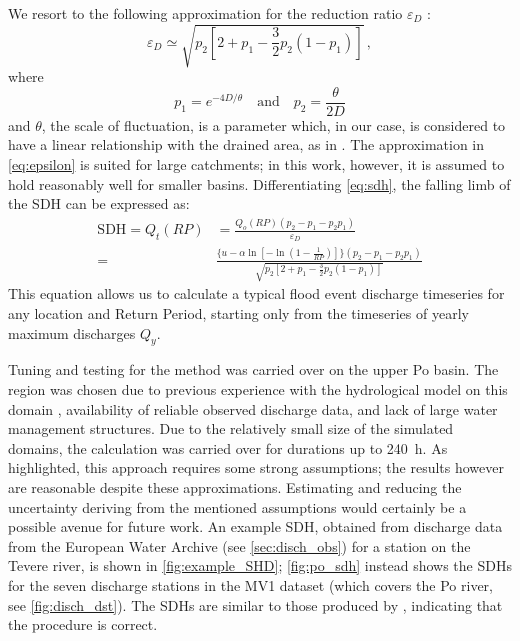 We resort to the following approximation for the reduction ratio $\varepsilon_D$ :
\begin{equation}\label{eq:epsilon}
  \varepsilon_D \simeq \sqrt{p_2 \left[ 2 + p_1 - \frac{3}{2}p_2 \left(1 - p_1 \right) \right]} \,,
\end{equation}
where
\begin{equation}
  p_1 = e^{-4D/\theta} \quad \textrm{and} \quad p_2 = \frac{\theta}{2D}
\end{equation}
and $\theta$, the scale of fluctuation, is a parameter which, in our case, is considered to have a linear relationship with the drained area, as in \citet{Maione2003}. The approximation in \cref{eq:epsilon} is suited for large catchments; in this work, however, it is assumed to hold reasonably well for smaller basins.
Differentiating \cref{eq:sdh}, the falling limb of the SDH can be expressed as:
\begin{equation}
\begin{split}
  \text{SDH} = Q_t\left(RP\right) & = \frac{Q_o\left(RP\right) \left(p_2 - p_1 - p_2p_1\right)}{\varepsilon_D} \\ =
  & \frac{\lbrace u - \alpha \ln \left[ -\ln \left(1 - \frac{1}{RP} \right)\right]\rbrace \left(p_2 - p_1 - p_2p_1\right)}{\sqrt{p_2 \left[ 2 + p_1 - \frac{3}{2}p_2 \left(1 - p_1 \right) \right]}}
\end{split}
\end{equation}
This equation allows us to calculate a typical flood event discharge timeseries for any location and Return Period, starting only from the timeseries of yearly maximum discharges $Q_y$.

Tuning and testing for the method was carried over on the upper Po basin. The region was chosen due to previous experience with the hydrological model on this domain \citep{coppola2014ChahydconPobasundglowar}, availability of reliable observed discharge data, and lack of large water management structures.
Due to the relatively small size of the simulated domains, the calculation was carried over for durations up to \SI{240}{\hour}.
As highlighted, this approach requires some strong assumptions; the results however are reasonable despite these approximations.
Estimating and reducing the uncertainty deriving from the mentioned assumptions would certainly be a possible avenue for future work.
An example SDH, obtained from discharge data from the European Water Archive (see \cref{sec:disch_obs}) for a station on the Tevere river, is shown in \cref{fig:example_SHD}; \cref{fig:po_sdh} instead shows the SDHs for the seven discharge stations in the MV1 dataset (which covers the Po river, see \cref{fig:disch_dst}). The SDHs are similar to those produced by \citet{Maione2003}, indicating that the procedure is correct.

